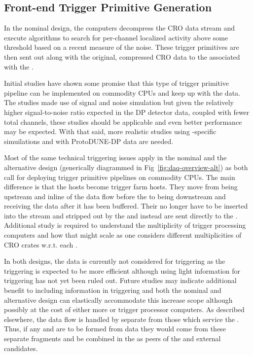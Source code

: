 \subsection{Front-end Trigger Primitive Generation}
\label{sec:fd-daq-fetp}

In the nominal design, the  computers decompress the
CRO data stream and execute algorithms to search for per-channel
localized activity above some threshold based on a recent measure of
the noise. 
These trigger primitives are then sent out along with the original,
compressed CRO data to the  associated with the .

Initial studies have shown some promise that this type of trigger
primitive pipeline can be implemented on commodity CPUs and keep up
with the data. 
The studies made use of  signal and noise simulation but
given the relatively higher signal-to-noise ratio expected in the DP
detector data, coupled with fewer total channels, these studies should
be applicable and even better performance may be expected. 
With that said, more realistic studies using -specific
simuilations and with ProtoDUNE-DP data are needed.

Most of the same technical triggering issues apply in the nominal and
the alternative design (generically diagrammed in
Fig~\ref{fig:daq-overview-alt}) as both call for deploying trigger
primitive pipelines on commodity CPUs. 
The main difference is that the  hosts become trigger farm
hosts. 
They move from being upstream and inline of the data flow before the
 to being downstream and receiving the data after it has
been buffered. 
Their  no longer have to be inserted into the
stream and stripped out by the  and instead are sent
directly to the . 
Additional study is required to understand the multiplicity of trigger
processing computers and how that might scale as one considers
different multiplicities of CRO  crates w.r.t. each
.

In both designs, the  data is currently not considered for
triggering as the  triggering is expected to be more
efficient although using light information for triggering has not yet
been ruled out. 
Future studies may indicate additional benefit to including
 information in triggering and both the nominal and
alternative design can elastically accommodate this increase scope
although possibly at the cost of either more  or trigger
processor computers.
As described elsewhere, the  data flow is handled by
separate  from those which service the . 
Thus, if any  and  are to
be formed from  data they would come from these separate
fragments and be combined in the  as peers of the
 and external candidates.

